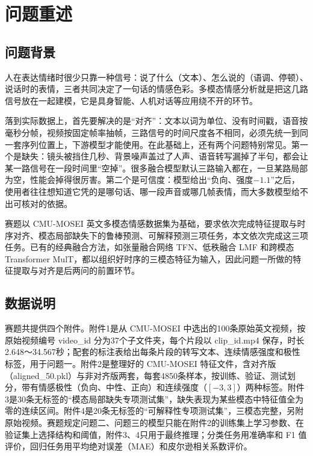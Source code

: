 \section{问题重述}

\subsection{问题背景}

人在表达情绪时很少只靠一种信号：说了什么（文本）、怎么说的（语调、停顿）、说话时的表情，三者共同决定了一句话的情感色彩。多模态情感分析就是把这几路信号放在一起建模，它是具身智能、人机对话等应用绕不开的环节。

落到实际数据上，首先要解决的是“对齐”：文本以词为单位、没有时间戳，语音按毫秒分帧，视频按固定帧率抽帧，三路信号的时间尺度各不相同，必须先统一到同一套序列位置上，下游模型才能使用。在此基础上，还有两个问题特别常见。第一个是缺失：镜头被挡住几秒、背景噪声盖过了人声、语音转写漏掉了半句，都会让某一路信号在一段时间里“空掉”。很多融合模型默认三路输入都在，一旦某路局部为空，性能会掉得很厉害。第二个是可信度：模型给出“负向、强度$-1.1$”之后，使用者往往想知道它凭的是哪句话、哪一段声音或哪几帧表情，而大多数模型给不出可核对的依据。

赛题以 CMU-MOSEI 英文多模态情感数据集\cite{zadeh2018mosei}为基础，要求依次完成特征提取与时序对齐、模态局部缺失下的鲁棒预测、可解释预测三项任务，本文依次完成这三项任务。已有的经典融合方法，如张量融合网络 TFN\cite{zadeh2017tfn}、低秩融合 LMF\cite{liu2018lmf} 和跨模态 Transformer MulT\cite{tsai2019mult}，都以组织好时序的三模态特征为输入\cite{zhang2024review}，因此问题一所做的特征提取与对齐是后两问的前置环节。

\subsection{数据说明}

赛题共提供四个附件。附件1是从 CMU-MOSEI 中选出的100条原始英文视频，按原始视频编号 video\_id 分为37个子文件夹，每个片段以 clip\_id.mp4 保存，时长2.648～34.567秒；配套的标注表给出每条片段的转写文本、连续情感强度和极性标签，用于问题一。附件2是整理好的 CMU-MOSEI 特征文件，含对齐版（aligned\_50.pkl）与非对齐版两套，每套4850条样本，按训练、验证、测试划分，带有情感极性（负向、中性、正向）和连续强度（$[-3,3]$）两种标签。附件3是30条无标签的“模态局部缺失专项测试集”，缺失表现为某些模态中特征值全为零的连续区间。附件4是20条无标签的“可解释性专项测试集”，三模态完整，另附原始视频。赛题规定问题二、问题三的模型只能在附件2的训练集上学习参数、在验证集上选择结构和阈值，附件3、4只用于最终推理；分类任务用准确率和 F1 值评价，回归任务用平均绝对误差（MAE）和皮尔逊相关系数评价。

